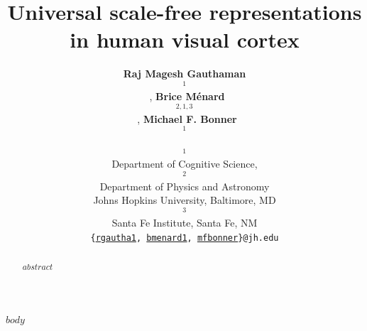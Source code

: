 \documentclass[10pt]{article}
\title{Universal scale-free representations\\in human visual cortex}
\author{
    \textbf{Raj Magesh Gauthaman$$^1$$}~\orcidlink{0000-0001-7121-1532},
    \textbf{Brice Ménard$$^{2,1,3}$$}~\orcidlink{0000-0003-3164-6974},
    \textbf{Michael F. Bonner$$^1$$}~\orcidlink{0000-0002-4992-674X}\\
    $$^1$$Department of Cognitive Science,
    $$^2$$Department of Physics and Astronomy\\
    Johns Hopkins University, Baltimore, MD\\
    $$^3$$Santa Fe Institute, Santa Fe, NM\\
    \texttt{\{\href{mailto:rgautha1@jh.edu}{rgautha1}, \href{mailto:bmenard1@jh.edu}{bmenard1}, \href{mailto:mfbonner@jh.edu}{mfbonner}\}@jh.edu}
}
\date{}
\begin{document}
\maketitle

\begin{abstract}
    $abstract$
\end{abstract}

$body$
\end{document}
